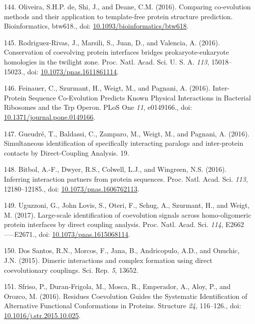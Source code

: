 \documentclass[11pt,a4paper,twoside]{book}
\theoremstyle{definition}
\theoremstyle{definition}
\theoremstyle{remark}
\begin{document}
\hypertarget{ref-DeOliveira2016}{}
144. Oliveira, S.H.P. de, Shi, J., and Deane, C.M. (2016). Comparing
co-evolution methods and their application to template-free protein
structure prediction. Bioinformatics, btw618., doi:
\href{https://doi.org/10.1093/bioinformatics/btw618}{10.1093/bioinformatics/btw618}.

\hypertarget{ref-Rodriguez-Rivas2016}{}
145. Rodriguez-Rivas, J., Marsili, S., Juan, D., and Valencia, A.
(2016). Conservation of coevolving protein interfaces bridges
prokaryote-eukaryote homologies in the twilight zone. Proc. Natl. Acad.
Sci. U. S. A. \emph{113}, 15018--15023., doi:
\href{https://doi.org/10.1073/pnas.1611861114}{10.1073/pnas.1611861114}.

\hypertarget{ref-Feinauer2016a}{}
146. Feinauer, C., Szurmant, H., Weigt, M., and Pagnani, A. (2016).
Inter-Protein Sequence Co-Evolution Predicts Known Physical Interactions
in Bacterial Ribosomes and the Trp Operon. PLoS One \emph{11},
e0149166., doi:
\href{https://doi.org/10.1371/journal.pone.0149166}{10.1371/journal.pone.0149166}.

\hypertarget{ref-Gueudre2016}{}
147. Gueudré, T., Baldassi, C., Zamparo, M., Weigt, M., and Pagnani, A.
(2016). Simultaneous identification of specifically interacting paralogs
and inter-protein contacts by Direct-Coupling Analysis. 19.

\hypertarget{ref-Bitbol2016}{}
148. Bitbol, A.-F., Dwyer, R.S., Colwell, L.J., and Wingreen, N.S.
(2016). Inferring interaction partners from protein sequences. Proc.
Natl. Acad. Sci. \emph{113}, 12180--12185., doi:
\href{https://doi.org/10.1073/pnas.1606762113}{10.1073/pnas.1606762113}.

\hypertarget{ref-Uguzzoni2017}{}
149. Uguzzoni, G., John Lovis, S., Oteri, F., Schug, A., Szurmant, H.,
and Weigt, M. (2017). Large-scale identification of coevolution signals
across homo-oligomeric protein interfaces by direct coupling analysis.
Proc. Natl. Acad. Sci. \emph{114}, E2662-----E2671., doi:
\href{https://doi.org/10.1073/pnas.1615068114}{10.1073/pnas.1615068114}.

\hypertarget{ref-DosSantos2015a}{}
150. Dos Santos, R.N., Morcos, F., Jana, B., Andricopulo, A.D., and
Onuchic, J.N. (2015). Dimeric interactions and complex formation using
direct coevolutionary couplings. Sci. Rep. \emph{5}, 13652.

\hypertarget{ref-Sfriso2016}{}
151. Sfriso, P., Duran-Frigola, M., Mosca, R., Emperador, A., Aloy, P.,
and Orozco, M. (2016). Residues Coevolution Guides the Systematic
Identification of Alternative Functional Conformations in Proteins.
Structure \emph{24}, 116--126., doi:
\href{https://doi.org/10.1016/j.str.2015.10.025}{10.1016/j.str.2015.10.025}.
\end{document}
